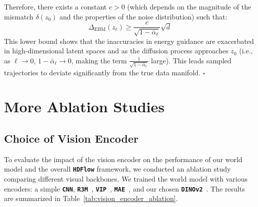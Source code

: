 \documentclass{article} %
\begin{document}
Therefore, there exists a constant $c > 0$ (which depends on the magnitude of the mismatch $\delta(z_0)$ and the properties of the noise distribution) such that:
    \[
    \Delta_{\text{EBM}}(z_\ell) \ge \frac{c}{\sqrt{1-\bar{\alpha}_\ell}}\sqrt{d}
    \]
This lower bound shows that the inaccuracies in energy guidance are exacerbated in high-dimensional latent spaces and as the diffusion process approaches $z_0$ (i.e., as $\ell \to 0$, $1-\bar{\alpha}_\ell \to 0$, making the term $\frac{1}{\sqrt{1-\bar{\alpha}_\ell}}$ large). This leads sampled trajectories to deviate significantly from the true data manifold. $\square$

\newpage
\section{More Ablation Studies}
\label{app:ablation}

\subsection{Choice of Vision Encoder}
To evaluate the impact of the vision encoder on the performance of our world model and the overall \texttt{\textbf{HDFlow}} framework, we conducted an ablation study comparing different visual backbones. We trained the world model with various encoders: a simple \texttt{\textbf{CNN}}, \texttt{\textbf{R3M}}~\citep{nair2022rm}, \texttt{\textbf{VIP}}~\citep{ma2023vip}, \texttt{\textbf{MAE}}~\citep{he2022masked}, and our chosen \texttt{\textbf{DINOv2}}~\citep{oquab2024dinov}. The results are summarized in Table~\ref{tab:vision_encoder_ablation}.
\end{document}
